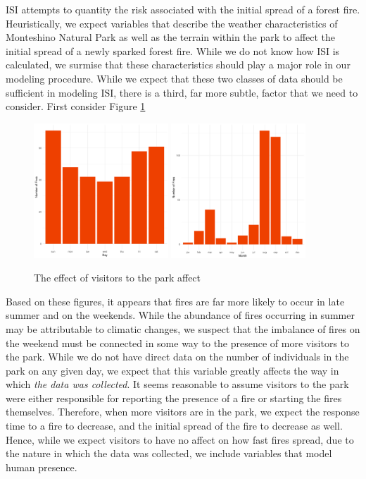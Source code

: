 \documentclass{article}
\begin{document}
ISI attempts to quantity the risk associated with the initial spread of a forest fire. Heuristically, we expect variables that describe the weather characteristics of Monteshino Natural Park as well as the terrain within the park to affect the initial spread of a newly sparked forest fire. While we do not know how ISI is calculated, we surmise that these characteristics should play a major role in our modeling procedure. While we expect that these two classes of data should be sufficient in modeling ISI, there is a third, far more subtle, factor that we need to consider. First consider Figure \ref{fig:human_factor}
\begin{figure}[h!]
\centering
\includegraphics[width=0.45\textwidth]{day_bar.pdf}
\includegraphics[width=0.45\textwidth]{month_bar.pdf}
\caption{The effect of visitors to the park affect }
\label{fig:human_factor}{}
\end{figure}
Based on these figures, it appears that fires are far more likely to occur in late summer and on the weekends. While the abundance of fires occurring in summer may be attributable to climatic changes, we suspect that the imbalance of fires on the weekend must be connected in some way to the presence of more visitors to the park. While we do not have direct data on the number of individuals in the park on any given day, we expect that this variable greatly affects the way in which \textit{the data was collected}. It seems reasonable to assume visitors to the park were either responsible for reporting the presence of a fire or starting the fires themselves. Therefore, when more visitors are in the park, we expect the response time to a fire to decrease, and the initial spread of the fire to decrease as well. Hence, while we expect visitors to have no affect on how fast fires spread, due to the nature in which the data was collected, we include variables that model human presence.  
\end{document}
